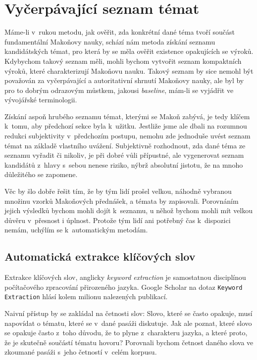 \section{Vyčerpávající seznam témat}

Máme-li v~rukou metodu, jak ověřit, zda konkrétní dané téma tvoří součást
fundamentální Makoňovy nauky, schází nám metoda získání seznamu kandidátských
témat, pro která by se měla ověřit existence opakujících se výroků. Kdybychom
takový seznam měli, mohli bychom vytvořit seznam kompaktních výroků, které
charakterizují Makoňovu nauku. Takový seznam by sice nemohl být považován za
vyčerpávající a autoritativní shrnutí Makoňovy nauky, ale byl by pro to dobrým
odrazovým můstkem, jakousi \textit{baseline}, mám-li se vyjádřit ve vývojářské
terminologii.

Získání aspoň hrubého seznamu témat, kterými se Makoň zabývá, je tedy klíčem
k~tomu, aby předchozí sekce byla k~užitku. Jestliže jsme ale dbali na rozumnou
redukci subjektivity v~předchozím postupu, nemohu zde jednoduše uvést seznam
témat na základě vlastního uvážení. Subjektivně rozhodnout, zda dané téma ze
seznamu vyřadit či nikoliv, je při dobré vůli přípustné, ale vygenerovat seznam
kandidátů z~hlavy s~sebou nenese riziko, nýbrž absolutní jistotu, že na mnoho
důležitého se zapomene.

Věc by šlo dobře řešit tím, že by tým lidí prošel velkou, náhodně vybranou
množinu vzorků Makoňových přednášek, a témata by zapisovali. Porovnáním jejich
výsledků bychom mohli dojít k~seznamu, u něhož bychom mohli mít velkou důvěru
v~přesnost i úplnost. Protože tým lidí ani potřebný čas k~dispozici nemám,
uchýlím se k~automatickým metodám.

\subsection{Automatická extrakce klíčových slov}
\label{kap:keywords}

Extrakce klíčových slov, anglicky \textit{keyword extraction} je samostatnou
disciplínou počítačového zpracování přirozeného jazyka. Google Scholar na dotaz
\texttt{Keyword Extraction} hlásí kolem milionu nalezených publikací.

Naivní přístup by se zakládal na četnosti slov: Slovo, které se často opakuje,
musí napovídat o tématu, které se v~dané pasáži diskutuje. Jak ale poznat, které
slovo se opakuje často z~toho důvodu, že to plyne z~charakteru jazyka, a které
proto, že je skutečně součástí tématu hovoru? Porovnali bychom četnost daného
slova ve zkoumané pasáži s~jeho četností v~celém korpusu.

